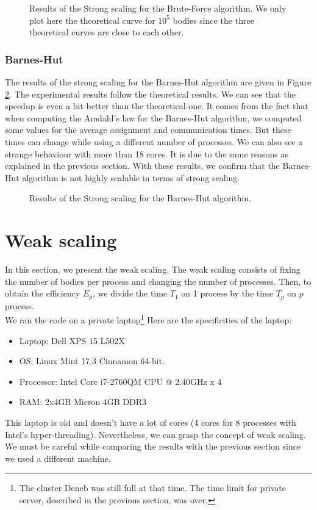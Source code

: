 \documentclass[10pt,a4paper]{article}
\begin{document}
\begin{figure}[H]
\centering

\caption{\label{fig:bf_strong} Results of the Strong scaling for the Brute-Force algorithm. We only plot here the theoretical curve for $10^5$ bodies since the three theoretical curves are close to each other.}
\end{figure}

\subsubsection{Barnes-Hut}

The results of the strong scaling for the Barnes-Hut algorithm are given in Figure \ref{fig:bh_strong}. The experimental results follow the theoretical results. We can see that the speedup is even a bit better than the theoretical one. It comes from the fact that when computing the Amdahl's law for the Barnes-Hut algorithm, we computed some values for the average assignment and communication times. But these times can change while using a different number of processes. We can also see a strange behaviour with more than 18 cores. It is due to the same reasons as explained in the previous section. With these results, we confirm that the Barnes-Hut algorithm is not highly scalable in terms of strong scaling.

\begin{figure}[H]
\centering

\caption{\label{fig:bh_strong} Results of the Strong scaling for the Barnes-Hut algorithm.}
\end{figure}

\section{Weak scaling}

In this section, we present the weak scaling. The weak scaling consists of fixing the number of bodies per process and changing the number of processes. Then, to obtain the efficiency $E_p$, we divide the time $T_1$ on 1 process by the time $T_p$ on $p$ process.
\\
We ran the code on a private laptop\footnote{The cluster Deneb was still full at that time. The time limit for private server, described in the previous section, was over.} Here are the specificities of the laptop:
\begin{itemize}
\item Laptop: Dell XPS 15 L502X
\item OS: Linux Mint 17.3 Cinnamon 64-bit.
\item Processor: Intel Core i7-2760QM CPU @ 2.40GHz x 4
\item RAM: 2x4GB Micron 4GB DDR3
\end{itemize}
This laptop is old and doesn't have a lot of cores (4 cores for 8 processes with Intel's hyper-threading). Nevertheless, we can grasp the concept of weak scaling. We must be careful while comparing the results with the previous section since we used a different machine.
\end{document}
